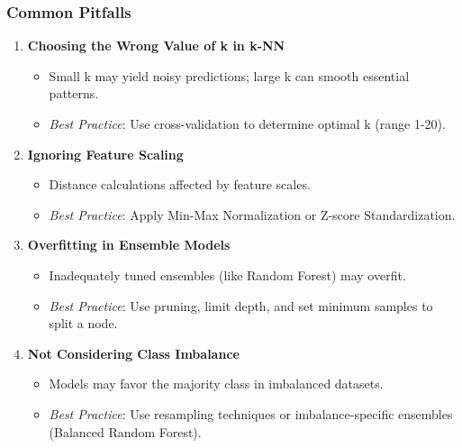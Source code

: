 \documentclass[aspectratio=169]{beamer}
\begin{document}
\begin{frame}[fragile]
    \frametitle{Common Pitfalls}
    \begin{enumerate}
        \item \textbf{Choosing the Wrong Value of k in k-NN}
            \begin{itemize}
                \item Small k may yield noisy predictions; large k can smooth essential patterns.
                \item \textit{Best Practice}: Use cross-validation to determine optimal k (range 1-20).
            \end{itemize}
        \item \textbf{Ignoring Feature Scaling}
            \begin{itemize}
                \item Distance calculations affected by feature scales.
                \item \textit{Best Practice}: Apply Min-Max Normalization or Z-score Standardization.
            \end{itemize}
        \item \textbf{Overfitting in Ensemble Models}
            \begin{itemize}
                \item Inadequately tuned ensembles (like Random Forest) may overfit.
                \item \textit{Best Practice}: Use pruning, limit depth, and set minimum samples to split a node.
            \end{itemize}
        \item \textbf{Not Considering Class Imbalance}
            \begin{itemize}
                \item Models may favor the majority class in imbalanced datasets.
                \item \textit{Best Practice}: Use resampling techniques or imbalance-specific ensembles (Balanced Random Forest).
            \end{itemize}
    \end{enumerate}
\end{frame}
\end{document}
